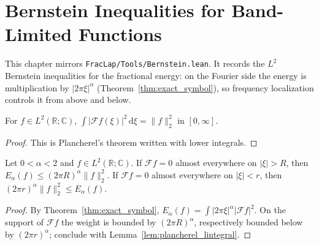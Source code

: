 \chapter{Bernstein Inequalities for Band-Limited Functions}

This chapter mirrors \texttt{FracLap/Tools/Bernstein.lean}. It records the $L^2$ Bernstein inequalities for the fractional energy: on the Fourier side the energy is multiplication by $\lvert 2\pi\xi\rvert^{\alpha}$ (Theorem~\ref{thm:exact_symbol}), so frequency localization controls it from above and below.

\begin{lemma}\label{lem:plancherel_lintegral}
\leanok
For $f \in L^2(\mathbb{R}; \mathbb{C})$, $\int \lvert \mathcal{F} f(\xi)\rvert^2\, \mathrm{d}\xi = \lVert f\rVert_2^2$ in $[0, \infty]$.
\end{lemma}

\begin{proof}
\leanok
This is Plancherel's theorem written with lower integrals.
\end{proof}

\begin{theorem}\label{thm:bernstein_l2}
\leanok
Let $0 < \alpha < 2$ and $f \in L^2(\mathbb{R}; \mathbb{C})$. If $\mathcal{F} f = 0$ almost everywhere on $\lvert\xi\rvert > R$, then $E_\alpha(f) \le (2\pi R)^{\alpha} \lVert f\rVert_2^2$. If $\mathcal{F} f = 0$ almost everywhere on $\lvert\xi\rvert < r$, then $(2\pi r)^{\alpha} \lVert f\rVert_2^2 \le E_\alpha(f)$.
\end{theorem}

\begin{proof}
\leanok
By Theorem~\ref{thm:exact_symbol}, $E_\alpha(f) = \int \lvert 2\pi\xi\rvert^{\alpha} \lvert\mathcal{F} f\rvert^2$. On the support of $\mathcal{F} f$ the weight is bounded by $(2\pi R)^{\alpha}$, respectively bounded below by $(2\pi r)^{\alpha}$; conclude with Lemma~\ref{lem:plancherel_lintegral}.
\end{proof}
